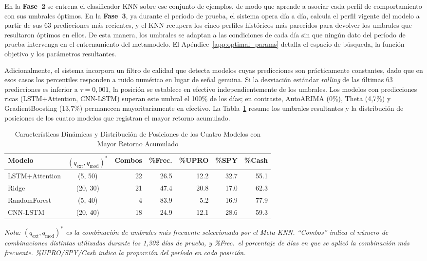 ﻿\documentclass[11pt,a4paper]{article}
\begin{document}
En la \textbf{Fase~2} se entrena el clasificador KNN sobre ese conjunto de ejemplos, de modo que aprende a asociar cada perfil de comportamiento con sus umbrales \'optimos. En la \textbf{Fase~3}, ya durante el per\'iodo de prueba, el sistema opera d\'ia a d\'ia, calcula el perfil vigente del modelo a partir de sus 63 predicciones m\'as recientes, y el KNN recupera los cinco perfiles hist\'oricos m\'as parecidos para devolver los umbrales que resultaron \'optimos en ellos. De esta manera, los umbrales se adaptan a las condiciones de cada d\'ia sin que ning\'un dato del per\'iodo de prueba intervenga en el entrenamiento del metamodelo. El Ap\'endice~\ref{app:optimal_params} detalla el espacio de b\'usqueda, la funci\'on objetivo y los par\'ametros resultantes.

Adicionalmente, el sistema incorpora un filtro de calidad que detecta modelos cuyas predicciones son pr\'acticamente constantes, dado que en esos casos los percentiles responden a ruido num\'erico en lugar de se\~nal genuina. Si la desviaci\'on est\'andar \textit{rolling} de las \'ultimas 63 predicciones es inferior a $\tau = 0{,}001$, la posici\'on se establece en efectivo independientemente de los umbrales. Los modelos con predicciones ricas (LSTM+Attention, CNN-LSTM) superan este umbral el 100\% de los d\'ias; en contraste, AutoARIMA (0\%), Theta (4{,}7\%) y GradientBoosting (13{,}7\%) permanecen mayoritariamente en efectivo. La Tabla~\ref{tab:optimal_params_winners} resume los umbrales resultantes y la distribuci\'on de posiciones de los cuatro modelos que registran el mayor retorno acumulado.

\begin{table}[htbp]
\centering
\caption{Caracter\'isticas Din\'amicas y Distribuci\'on de Posiciones de los Cuatro Modelos con Mayor Retorno Acumulado}
\label{tab:optimal_params_winners}
\small
\begin{tabular}{@{}lcrrrrr@{}}
\toprule
\textbf{Modelo} & $(q_{\text{ext}}, q_{\text{mod}})^*$ & \textbf{Combos} & \textbf{\%Frec.} & \textbf{\%UPRO} & \textbf{\%SPY} & \textbf{\%Cash} \\
\midrule
LSTM+Attention & (5, 50) & 22 & 26.5 & 12.2 & 32.7 & 55.1 \\
Ridge & (20, 30) & 21 & 47.4 & 20.8 & 17.0 & 62.3 \\
RandomForest & (5, 40) & 4 & 83.9 & 5.2 & 16.9 & 77.9 \\
CNN-LSTM & (20, 40) & 18 & 24.9 & 12.1 & 28.6 & 59.3 \\
\bottomrule
\end{tabular}
\vspace{0.2cm}
\parbox{0.95\textwidth}{\footnotesize\textit{Nota: $(q_{\text{ext}}, q_{\text{mod}})^*$ es la combinaci\'on de umbrales m\'as frecuente seleccionada por el Meta-KNN. ``Combos'' indica el n\'umero de combinaciones distintas utilizadas durante los 1{,}302 d\'ias de prueba, y \%Frec.\ el porcentaje de d\'ias en que se aplic\'o la combinaci\'on m\'as frecuente. \%UPRO/SPY/Cash indica la proporci\'on del per\'iodo en cada posici\'on.}}
\end{table}
\end{document}
